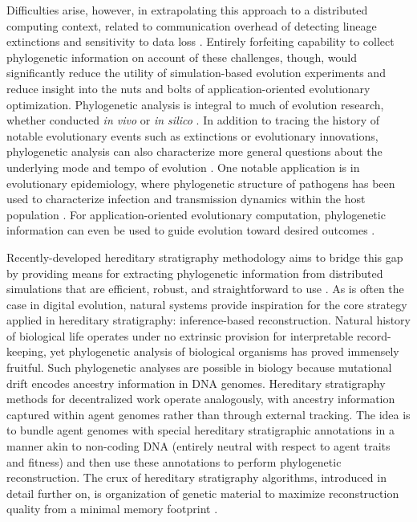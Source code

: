 Difficulties arise, however, in extrapolating this approach to a distributed computing context, related to communication overhead of detecting lineage extinctions and sensitivity to data loss \citep{moreno2024algorithms}.
Entirely forfeiting capability to collect phylogenetic information on account of these challenges, though, would significantly reduce the utility of simulation-based evolution experiments and reduce insight into the nuts and bolts of application-oriented evolutionary optimization.
Phylogenetic analysis is integral to much of evolution research, whether conducted \textit{in vivo} or \textit{in silico} \citep{faithConservationEvaluationPhylogenetic1992, STAMATAKIS2005phylogenetics,frenchHostPhylogenyShapes2023,kim2006discovery,lewinsohnStatedependentEvolutionaryModels2023a,lenski2003evolutionary}.
In addition to tracing the history of notable evolutionary events such as extinctions or evolutionary innovations, phylogenetic analysis can also characterize more general questions about the underlying mode and tempo of evolution \citep{moreno2023toward,hernandez2022can,shahbandegan2022untangling,lewinsohnStatedependentEvolutionaryModels2023a}.
One notable application is in evolutionary epidemiology, where phylogenetic structure of pathogens has been used to characterize infection and transmission dynamics within the host population \citep{giardina2017inference,voznica2022deep}.
For application-oriented evolutionary computation, phylogenetic information can even be used to guide evolution toward desired outcomes \citep{lalejini2024phylogeny,lalejini2024runtime,murphy2008simple,burke2003increased}.

Recently-developed hereditary stratigraphy methodology aims to bridge this gap by providing means for extracting phylogenetic information from distributed simulations that are efficient, robust, and straightforward to use \citep{moreno2022hereditary}.
As is often the case in digital evolution, natural systems provide inspiration for the core strategy applied in hereditary stratigraphy: inference-based reconstruction.
Natural history of biological life operates under no extrinsic provision for interpretable record-keeping, yet phylogenetic analysis of biological organisms has proved immensely fruitful.
Such phylogenetic analyses are possible in biology because mutational drift encodes ancestry information in DNA genomes.
Hereditary stratigraphy methods for decentralized work operate analogously, with ancestry information captured within agent genomes rather than through external tracking.
The idea is to bundle agent genomes with special hereditary stratigraphic annotations in a manner akin to non-coding DNA (entirely neutral with respect to agent traits and fitness) and then use these annotations to perform phylogenetic reconstruction.
The crux of hereditary stratigraphy algorithms, introduced in detail further on, is organization of genetic material to maximize reconstruction quality from a minimal memory footprint \citep{moreno2022hereditary}.

